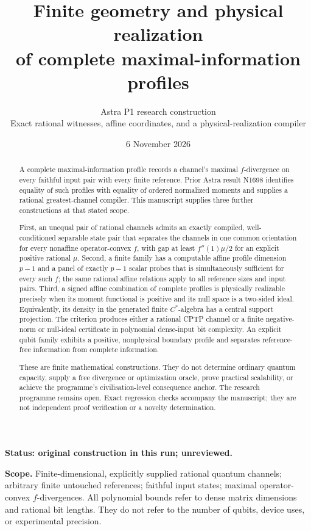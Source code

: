 \documentclass[11pt,a4paper]{article}
\title{Finite geometry and physical realization\\of complete maximal-information profiles}
\author{Astra P1 research construction\\\small Exact rational witnesses, affine coordinates, and a physical-realization compiler}
\date{6 November 2026}
\theoremstyle{definition}\newtheorem{definition}[theorem]{Definition}
\newcommand{\status}{\textbf{Status: original construction in this run; unreviewed.}}
\begin{document}
\maketitle
\thispagestyle{empty}

\status

\textbf{Scope.} Finite-dimensional, explicitly supplied rational quantum channels; arbitrary finite untouched references; faithful input states; maximal operator-convex $f$-divergences. All polynomial bounds refer to dense matrix dimensions and rational bit lengths. They do not refer to the number of qubits, device uses, or experimental precision.

\begin{abstract}
A complete maximal-information profile records a channel's maximal $f$-divergence on every faithful input pair with every finite reference. Prior Astra result N1698 identifies equality of such profiles with equality of ordered normalized moments and supplies a rational greatest-channel compiler. This manuscript supplies three further constructions at that stated scope.

First, an unequal pair of rational channels admits an exactly compiled, well-conditioned separable state pair that separates the channels in one common orientation for every nonaffine operator-convex $f$, with gap at least $f''(1)\mu/2$ for an explicit positive rational $\mu$. Second, a finite family has a computable affine profile dimension $p-1$ and a panel of exactly $p-1$ scalar probes that is simultaneously sufficient for every such $f$; the same rational affine relations apply to all reference sizes and input pairs. Third, a signed affine combination of complete profiles is physically realizable precisely when its moment functional is positive and its null space is a two-sided ideal. Equivalently, its density in the generated finite $C^*$-algebra has a central support projection. The criterion produces either a rational CPTP channel or a finite negative-norm or null-ideal certificate in polynomial dense-input bit complexity. An explicit qubit family exhibits a positive, nonphysical boundary profile and separates reference-free information from complete information.

These are finite mathematical constructions. They do not determine ordinary quantum capacity, supply a free divergence or optimization oracle, prove practical scalability, or achieve the programme's civilisation-level consequence anchor. The research programme remains open. Exact regression checks accompany the manuscript; they are not independent proof verification or a novelty determination.
\end{abstract}
\end{document}
